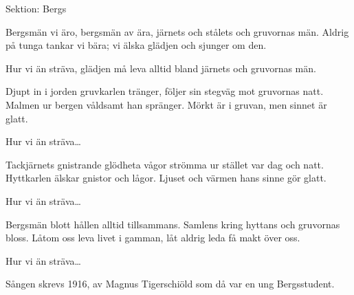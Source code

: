 \begin{song}

\begin{songmeta}
Sektion: Bergs
\end{songmeta}

\begin{songtext}
Bergsmän vi äro,
bergsmän av ära,
järnets och stålets och gruvornas män.
Aldrig på tunga
tankar vi bära;
vi älska glädjen och sjunger om den.

Hur vi än sträva,
glädjen må leva
alltid bland järnets och gruvornas män.

Djupt in i jorden
gruvkarlen tränger,
följer sin stegväg mot gruvornas natt.
Malmen ur bergen
våldsamt han spränger.
Mörkt är i gruvan, men sinnet är glatt.

Hur vi än sträva\ldots

Tackjärnets gnistrande
glödheta vågor
strömma ur stället var dag och natt.
Hyttkarlen älskar
gnistor och lågor.
Ljuset och värmen hans sinne gör glatt.

Hur vi än sträva\ldots

Bergsmän blott hållen
alltid tillsammans.
Samlens kring hyttans och gruvornas bloss.
Låtom oss leva
livet i gamman,
låt aldrig leda få makt över oss.

Hur vi än sträva\ldots
\end{songtext}

\begin{songnotes}
Sången skrevs 1916, av Magnus Tigerschiöld som då var en ung Bergsstudent.
\end{songnotes}
\end{song}
